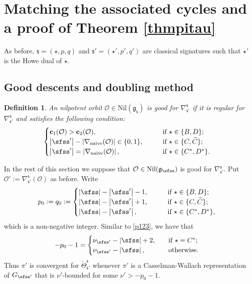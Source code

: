 \documentclass[12pt,a4paper]{amsart}
\def\abs#1{\left|{#1}\right|}
\newcommand{\CO}{{\mathcal {O}}}
\newcommand{\g}{\mathfrak g}
\def\DD{\nabla}
\newcommand{\be}{\begin {equation}}
\newcommand{\ee}{\end {equation}}
\numberwithin{equation}{section}
\newtheorem{defn}[thm]{Definition}
\theoremstyle{remark}
\begin{document}
\section{Matching the associated  cycles and a proof of Theorem \ref{thmpitau}}\label{sec:equac}



As before, $\mathsf s=(\star, p,q)$ and $ \mathsf s'=(\star', p',q')$ are classical signatures such that $\star'$ is the Howe dual of $\star$.


\subsection{Good descents and doubling method}


\begin{defn}
An nilpotent orbit $\CO\in \mathrm{Nil}(\g_\mathsf s)$ is good for $\DD_{\mathsf s'}^{\mathsf s}$ if it is regular for $\DD_{\mathsf s'}^{\mathsf s}$ and satisfies the following  condition:
\[
\begin{cases}
   \mathbf c_1(\CO)>\mathbf c_2(\CO), \qquad  &\textrm{if $\star \in\{B,D\}$}; \\
      \abs{\sfss'}-\abs{\DD_\mathrm{naive}(\CO)}\in\{0,1\},\qquad  &\textrm{if $\star \in\{C, \widetilde C\}$}; \\
\abs{\sfss'}=\abs{\DD_\mathrm{naive}(\CO)}, \qquad &\textrm{if $\star \in \{C^*, D^*\}$}.
  \end{cases}
\]


\end{defn}

In the rest of this section we suppose that $\CO\in \mathrm{Nil}(\g_\sfss)$ is good for $\DD_{\mathsf s'}^{\mathsf s}$. Put $\CO':=\DD_{\mathsf s'}^{\mathsf s}(\CO)$ as before. Write
 \[
  p_0:=q_0:=\begin{cases}
    \abs{\sfss}-\abs{\sfss'}-1, \qquad  &\textrm{if $\star \in\{B,D\}$}; \\
       \abs{\sfss}-\abs{\sfss'}+1, \qquad  &\textrm{if $\star \in\{C, \widetilde C\}$}; \\
 \abs{\sfss}-\abs{\sfss'},\qquad  &\textrm{if $\star \in \{C^*, D^*\}$},
  \end{cases}
\]
which is a non-negative integer.
Similar to \eqref{p123}, we have that
\be\label{p1234}
-p_0-1=
  \begin{cases}
 \nu_{\sfss'}-\abs{\sfss} +2,\quad& \textrm{if $\star =C^*$};\\
  \nu_{\sfss'}-\abs{\sfss},\quad& \textrm{otherwise}.
   \end{cases}
   \ee
Thus    $\pi'$ is convergent for $\check \Theta_{\mathsf s'}^{\mathsf s}$ whenever $\pi'$ is a Casselman-Wallach representation of $G_{\sfss'}$  that is  $\nu'$-bounded for some
$
  \nu'>
 -p_0-1.
$
\end{document}
